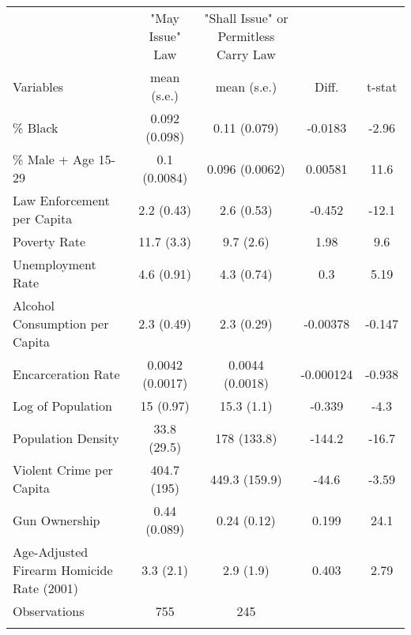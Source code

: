 \begin{tabular}{lcccc}
 &  &  &  & \tabularnewline
\hline
\hline
 &  "May Issue" Law & "Shall Issue" or Permitless Carry Law \tabularnewline
Variables & mean (s.e.) & mean (s.e.) & Diff. & t-stat \tabularnewline
\hline
\% Black & 0.092 (0.098) & 0.11 (0.079) & -0.0183 & -2.96 \tabularnewline
\% Male + Age 15-29 & 0.1 (0.0084) & 0.096 (0.0062) & 0.00581 & 11.6 \tabularnewline
Law Enforcement per Capita & 2.2 (0.43) & 2.6 (0.53) & -0.452 & -12.1 \tabularnewline
Poverty Rate & 11.7 (3.3) & 9.7 (2.6) & 1.98 & 9.6 \tabularnewline
Unemployment Rate & 4.6 (0.91) & 4.3 (0.74) & 0.3 & 5.19 \tabularnewline
Alcohol Consumption per Capita & 2.3 (0.49) & 2.3 (0.29) & -0.00378 & -0.147 \tabularnewline
Encarceration Rate & 0.0042 (0.0017) & 0.0044 (0.0018) & -0.000124 & -0.938 \tabularnewline
Log of Population & 15 (0.97) & 15.3 (1.1) & -0.339 & -4.3 \tabularnewline
Population Density & 33.8 (29.5) & 178 (133.8) & -144.2 & -16.7 \tabularnewline
Violent Crime per Capita & 404.7 (195) & 449.3 (159.9) & -44.6 & -3.59 \tabularnewline
Gun Ownership & 0.44 (0.089) & 0.24 (0.12) & 0.199 & 24.1 \tabularnewline
Age-Adjusted Firearm Homicide Rate (2001) & 3.3 (2.1) & 2.9 (1.9) & 0.403 & 2.79 \tabularnewline
Observations & 755 & 245 &  &  \tabularnewline
\hline
\hline
 &  &  &  & \tabularnewline
\end{tabular}
